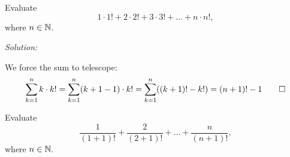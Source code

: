 \documentclass[12pt]{scrartcl}
\newenvironment{problem}[2][Problem]{\begin{trivlist}
\item[\hskip \labelsep {\bfseries #1}\hskip \labelsep {\bfseries #2.}]}{\end{trivlist}}
\newenvironment{sol}
    {\emph{Solution:}
    }
    {
    \qedhere
    }
\begin{document}




\begin{problem}{7}
Evaluate
\[
	1 \cdot 1! + 2 \cdot 2! + 3 \cdot 3! + \ldots + n \cdot n!,
\]
where $n \in \mathbb N$. 
\end{problem}

\begin{sol}
We force the sum to telescope: 
\[
	\sum_{k=1}^n k \cdot k! = \sum_{k=1}^n (k+1 - 1) \cdot k! = \sum_{k=1}^n ((k+1)! - k!) = (n+1)! - 1 \qed
\]
\end{sol}

\begin{problem}{8}
Evaluate
\[
	\frac{1}{(1 + 1)!} + \frac{2}{(2 + 1)!} + \ldots + \frac{n}{(n + 1)!},
\]
where $n \in \mathbb N$. 
\end{problem}
\end{document}
